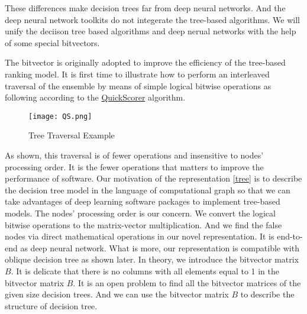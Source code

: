 \documentclass[UTF8]{article}
\begin{document}
These differences make decision trees far from deep neural networks.
And the deep neural network toolkits do not integerate the tree-based algorithms.
We will unify the deciison tree based algorithms and deep nerual networks with the help of some special bitvectors.

 
The bitvector is originally adopted to improve the efficiency of the tree-based ranking model.
It is first time to illustrate how to perform an interleaved traversal of the ensemble
by means of simple logical bitwise operations as following according to
the \href{http://pages.di.unipi.it/rossano/wp-content/uploads/sites/7/2015/11/sigir15.pdf}{QuickScorer}\cite{DatoFast,lettich2016gpu-based,lucchese2015quickscorer:,lucchese2017quickscorer:} algorithm.
\begin{figure}[H] %
\centering %
\texttt{[image: QS.png]}
\caption{Tree Traversal Example}  %
\label{Fig.TTE} %
\footnotemark
\end{figure}

As shown, this traversal is of fewer operations and insensitive to nodes' processing order.
It is the fewer operations that matters to improve the performance of software.
Our motivation of the representation \eqref{tree} is to describe the decision tree model
in the language of computational graph
so that we can take advantages of deep learning software packages to implement tree-based models.
The nodes' processing order is our concern.
We convert the logical bitwise operations to the matrix-vector multiplication.
And we find  the false nodes via direct mathematical operations in our novel representation.
It is end-to-end as deep  neural network.
What is more, our representation is compatible with oblique decision tree as shown later.
In theory, we introduce the bitvector matrix $B$.
It is delicate that there is no columns with all elements equal to 1 in the bitvector matrix $B$.
It is an open problem to find all the bitvector matrices of the given size decision trees.
And we can use the bitvector matrix $B$ to describe the structure of decision tree.
\end{document}
